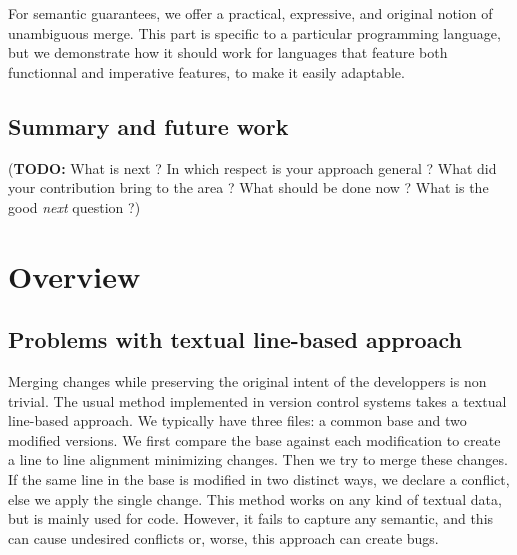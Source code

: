 \documentclass[a4paper,11pt]{article}
\newcommand\todo[1]{{\color{teal}(\textbf{TODO:} #1)}}
\begin{document}
For semantic guarantees, we offer a practical, expressive, and original notion of unambiguous merge. This part is specific to a particular programming language, but we demonstrate how it should work for languages that feature both functionnal and imperative features, to make it easily adaptable.

\subsection*{Summary and future work}

\todo{What is next ? In which respect is your approach general ?
What did your contribution bring to the area ?
What should be done now ?
What is the good \emph{next} question ?}

\section{Overview}
\label{sec:overview}

\subsection{Problems with textual line-based approach}
Merging changes while preserving the original intent of the
developpers is non trivial. The usual method implemented in version
control systems takes a textual line-based approach. We typically have
three files: a common base and two modified versions. We first compare
the base against each modification to create a line to line alignment
minimizing changes. Then we try to merge these changes. If the same
line in the base is modified in two distinct ways, we declare a
conflict, else we apply the single change. This method works on any
kind of textual data, but is mainly used for code. However, it fails
to capture any semantic, and this can cause undesired conflicts or,
worse, this approach can create bugs.
\end{document}
